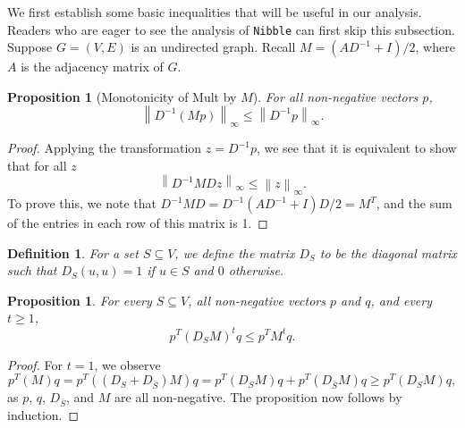 \documentclass[11pt]{article}
\newtheorem{proposition}[theorem]{Proposition}
\newtheorem{definition}[theorem]{Definition}
\def\norm#1{\left\| #1 \right\|}
\def\infnorm#1{\left\| #1 \right\|_{\infty }}
\begin{document}
We first establish some basic inequalities
  that will be useful in our analysis.
Readers who are eager to see the analysis of \texttt{Nibble}
  can first skip this subsection.
Suppose $G = (V,E)$ is an undirected graph.
Recall $M = (A D^{-1} + I) / 2$,  where $A$ is the
  adjacency matrix of $G$.


\begin{proposition}[Monotonicity of Mult by $M$]\label{pro:infnorm}
For all non-negative vectors $p$,
\[
  \infnorm{D^{-1} (M p)}
 \leq
  \infnorm{D^{-1} p}.
\]
\end{proposition}
\begin{proof}
Applying the transformation $z = D^{-1}p$, we see that it
  is equivalent to show that for all $z$
\[
  \norm{D^{-1} M D z}_{\infty } \leq \norm{z}_{\infty }.
\]
To prove this, we note that
  $D^{-1} M D = D^{-1} (AD^{-1}+I) D/2 = M^{T}$,
  and the sum of the entries in each row of this matrix is 1.
\end{proof}

\begin{definition}\label{def:DS}
For a set $S \subseteq V$, we define the matrix $D_{S}$ to be
  the diagonal matrix such that
  $D_{S} (u,u) = 1$ if $u \in S$ and $0$ otherwise.
\end{definition}

\begin{proposition}\label{pro:DS}
For every $S \subseteq V$, all
 non-negative vectors $p$ and $q$,
  and every $t \geq 1$,
\[
  p^{T} (D_{S} M)^{t} q \leq p^{T} M^{t} q.
\]
\end{proposition}
\begin{proof}
For $t=1$, we observe
\[
  p^{T} (M) q
=
  p^{T} ((D_{S} + D_{\bar{S}}) M) q
=
  p^{T} (D_{S} M) q +
  p^{T} (D_{\bar{S}} M) q
\geq
  p^{T} (D_{S} M) q,
\]
as $p$, $q$,  $D_{\bar{S}}$, and $M$ are all non-negative.
The proposition now follows by induction.
\end{proof}
\end{document}

